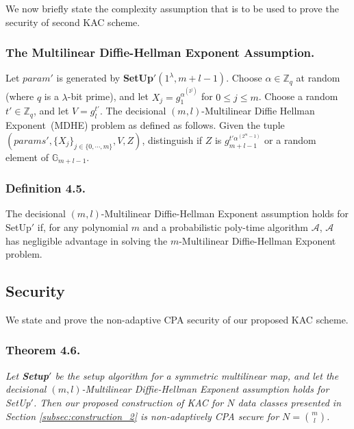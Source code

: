We now briefly state the complexity assumption that is to be used to prove the security of second KAC scheme.

\subsubsection{The Multilinear Diffie-Hellman Exponent Assumption.} Let $param'$ is generated by \textbf{SetUp}$'(1^{\lambda},m+l-1)$. Choose $\alpha \in \mathbb{Z}_q$ at random (where $q$ is a $\lambda$-bit prime), and let $X_j=g^{\alpha^{(2^j)}}_{1}$ for $0\leq j \leq m$. Choose a random $t'\in\mathbb{Z}_q$, and let $V=g^{t'}_{l}$. The decisional $(m,l)$-Multilinear Diffie Hellman Exponent~(MDHE) problem as defined as follows. Given the tuple $(params',\{X_j\}_{j\in\{0,\cdots,m\}},V,Z)$, distinguish if $Z$ is $g^{t'\alpha^{(2^m-1)}}_{m+l-1}$ or a random element of $\mathbb{G}_{m+l-1}$.

\subsubsection{Definition 4.5.} The decisional $(m,l)$-Multilinear Diffie-Hellman Exponent assumption holds for {SetUp}$'$ if, for any polynomial $m$ and a probabilistic poly-time algorithm $\mathcal{A}$, $\mathcal{A}$ has negligible advantage in solving the $m$-Multilinear Diffie-Hellman Exponent problem.

\subsection{Security}
\label{subsec:security2}

We state and prove the non-adaptive CPA security of our proposed KAC scheme.

\subsubsection{Theorem 4.6.} \textit{Let \textbf{Setup}$'$ be the setup algorithm for a symmetric multilinear map, and let the decisional $(m,l)$-Multilinear Diffie-Hellman Exponent assumption holds for {SetUp}$'$. Then our proposed construction of KAC for $N$ data classes presented in Section \ref{subsec:construction_2} is non-adaptively CPA secure for $N=\binom{m}{l}$.}

